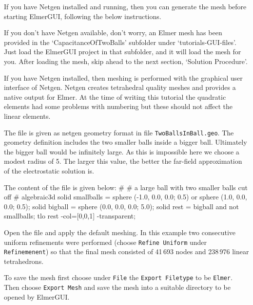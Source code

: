 If you have Netgen installed and running, then you can generate the mesh before starting ElmerGUI, following the below instructions.  

If you don't have Netgen available, don't worry, an Elmer mesh has been provided in the `CapacitanceOfTwoBalls'  subfolder under `tutorials-GUI-files'.  Just load the ElmerGUI project in that subfolder, and it will load the mesh for you.  After loading the mesh, skip ahead to the next section, `Solution Procedure'.

If you have Netgen installed, then meshing is performed with the graphical user interface of Netgen. Netgen creates tetrahedral quality meshes and provides a native output for Elmer.
At the time of writing this tutorial the quadratic elements had some problems with numbering 
but these should not affect the linear elements.

The file is given as netgen geometry format in file \texttt{TwoBallsInBall.geo}. The geometry definition includes the 
two smaller balls inside a bigger ball. Ultimately the bigger ball would be infinitely large. As this is impossible 
here we choose a modest radius of 5. The larger this value, the better the far-field approximation of the 
electrostatic solution is.

The content of the file is given below:
\ttbegin
#
# a large ball with two smaller balls cut off
#
algebraic3d
solid smallballs = sphere (-1.0, 0.0, 0.0; 0.5)
           or sphere (1.0, 0.0, 0.0; 0.5);
solid bigball = sphere (0.0, 0.0, 0.0; 5.0);
solid rest = bigball and not smallballs;
tlo rest -col=[0,0,1] -transparent;
\ttend

Open the file and apply the default meshing. In this example two consecutive uniform refinements were performed 
(choose \texttt{Refine Uniform} under \texttt{Refinemenent}) so that the 
final mesh consisted of 41\,693 nodes and 238\,976 linear tetrahedrons. 

To save the mesh first choose under \texttt{File} the \texttt{Export Filetype} to be \texttt{Elmer}. Then choose
\texttt{Export Mesh} and save the mesh into a suitable directory to be opened
by ElmerGUI. 

